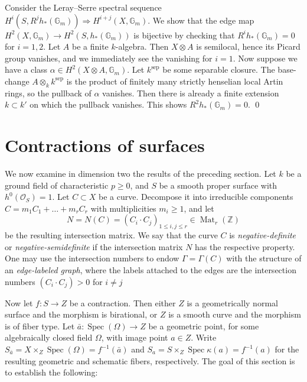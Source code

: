 \documentclass[oneside, 12pt]{amsart}
\newcommand\mylabel[1]{\label{#1}\marginpar{\vspace{-1ex}\medskip\medskip\footnotesize \tt #1}}
\renewcommand\mylabel[1]{\label{#1}}
\theoremstyle{definition}
\theoremstyle{remark}
\newcommand{\ZZ}{\mathbb{Z}}
\newcommand{\GG}{\mathbb{G}}
\newcommand{\Mat}{\operatorname{Mat}}
\renewcommand{\O}{\mathscr{O}}
\newcommand{\ra}{\rightarrow}
\newcommand{\sep}{{\operatorname{sep}}}
\newcommand{\Spec}{\operatorname{Spec}}
\newcommand{\ba}{{\bar{a}}}
\begin{document}
Consider the Leray--Serre spectral sequence $H^i(S,R^jh_*(\GG_{m}))\Rightarrow H^{i+j}(X,\GG_m)$.
We show that the edge map $H^2(X,\GG_m)\ra H^2(S,h_*(\GG_{m}))$ is bijective by checking that 
  $R^ih_*(\GG_{m})=0$ for $i=1,2$.
Let $A$ be a finite $k$-algebra. Then $X\otimes A$ is semilocal, hence its Picard group vanishes, and we immediately see the  
vanishing for $i=1$. Now suppose we have a  class $\alpha\in H^2(X\otimes A,\GG_m)$.
Let $k^\sep$ be some separable closure. The base-change $A\otimes_kk^\sep$ is the product of finitely many 
strictly henselian local Artin rings, so the pullback of $\alpha$ vanishes. Then there is already
a finite extension $k\subset k'$ on which the pullback vanishes. This shows $R^2h_*(\GG_m)=0$.
\qed

 
\section{Contractions of surfaces}
\mylabel{Contractions}

We now examine in dimension two the results of the preceding section.
Let $k$ be a ground field of characteristic $p\geq 0$, and 
 $S$ be a smooth proper surface with $h^0(\O_S)=1$.
Let $C\subset X$ be a curve. Decompose it into irreducible components  $C=m_1C_1+\ldots+m_rC_r$ with multiplicities $m_i\geq 1$, 
and let 
$$
N=N(C)=(C_i\cdot C_j)_{1\leq i,j\leq r}\in\Mat_r(\ZZ)
$$
be the resulting intersection matrix.  
We say that the curve $C$ is \emph{negative-definite}  or \emph{negative-semidefinite} if the
intersection matrix $N$ has the respective property. 
One may use the intersection numbers  to endow $\Gamma=\Gamma(C)$ with the
structure of an \emph{edge-labeled graph}, where the   labels attached to the edges are the intersection numbers
$(C_i\cdot C_j)>0$ for $i\neq j$

Now let  $f:S\ra Z$ be a
contraction. Then  either $Z$ is a geometrically normal   surface and the morphism is birational,
or $Z$ is a smooth curve and the morphism is of fiber type.
Let $\ba:\Spec(\Omega)\ra Z$ be a geometric point, for some algebraically closed field $\Omega$,
with image point $a\in Z$.
Write $S_\ba=X\times_Z\Spec(\Omega)=f^{-1}(\ba)$ and $S_a=S\times_Z\Spec\kappa(a)=f^{-1}(a)$ for the resulting geometric 
and schematic fibers, respectively. 
The goal of this section is to establish the following:
\end{document}
